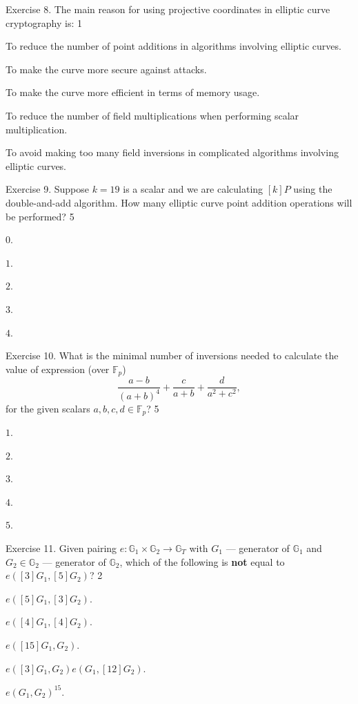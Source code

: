 \documentclass[../../book.tex]{subfiles}
\begin{document}
\begin{xexercise}
    {Exercise 8.}
    {The main reason for using projective coordinates in elliptic curve cryptography is:}
    {1}
    {
        \item To reduce the number of point additions in algorithms involving elliptic curves.
        \item To make the curve more secure against attacks.
        \item To make the curve more efficient in terms of memory usage.
        \item To reduce the number of field multiplications when performing scalar multiplication.
        \item To avoid making too many field inversions in complicated algorithms involving elliptic curves.
    }
\end{xexercise}

\begin{xexercise}
    {Exercise 9.}
    {Suppose $k=19$ is a scalar and we are calculating $[k]P$ using the double-and-add algorithm. How many elliptic curve point addition operations will be performed?}
    {5}
    {
        \item $0$.
        \item $1$.
        \item $2$.
        \item $3$.
        \item $4$.
    }
\end{xexercise}

\begin{xexercise}
    {Exercise 10.}
    {What is the minimal number of inversions needed to calculate the value of expression (over $\mathbb{F}_p$)
    \begin{equation*}
        \frac{a-b}{(a+b)^4} + \frac{c}{a+b} + \frac{d}{a^2+c^2},
    \end{equation*}
    for the given scalars $a,b,c,d \in \mathbb{F}_p$?}
    {5}
    {
        \item $1$.
        \item $2$.
        \item $3$.
        \item $4$.
        \item $5$.
    }
\end{xexercise}

\begin{xexercise}
    {Exercise 11.}
    {Given pairing $e: \mathbb{G}_1 \times \mathbb{G}_2 \to \mathbb{G}_T$ with $G_1$ --- generator of $\mathbb{G}_1$ and $G_2 \in \mathbb{G}_2$ --- generator of $\mathbb{G}_2$, which of the following is \textbf{not} equal to $e([3]G_1, [5]G_2)$?}
    {2}
    {
        \item $e([5]G_1, [3]G_2)$.
        \item $e([4]G_1, [4]G_2)$.
        \item $e([15]G_1, G_2)$.
        \item $e([3]G_1,G_2)e(G_1,[12]G_2)$.
        \item $e(G_1, G_2)^{15}$.
    }
\end{xexercise}
\end{document}
